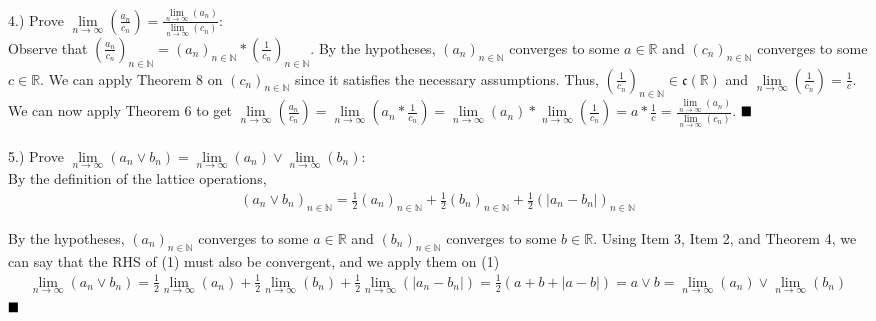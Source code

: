 \documentclass{book}
\begin{document}
4.) Prove $\lim \limits_{n \to \infty}{}\left(\frac{a_n}{c_n}\right) = \frac{\lim \limits_{n \to \infty}{}(a_n)}{\lim \limits_{n \to \infty}{}(c_n)}$: \\
Observe that $\left(\frac{a_n}{c_n}\right)_{n \in \mathbb{N}} = (a_n)_{n \in \mathbb{N}} * \left(\frac{1}{c_n}\right)_{n \in \mathbb{N}}$. By the hypotheses, $(a_n)_{n \in \mathbb{N}}$ converges to some $a \in \mathbb{R}$ and $(c_n)_{n \in \mathbb{N}}$ converges to some $c \in \mathbb{R}$. We can apply Theorem 8 on $(c_n)_{n \in \mathbb{N}}$ since it satisfies the necessary assumptions. Thus, $\left(\frac{1}{c_n}\right)_{n \in \mathbb{N}} \in \mathfrak{c}(\mathbb{R})$ and $\lim \limits_{n \to \infty}{}\left(\frac{1}{c_n}\right) = \frac{1}{c}$. We can now apply Theorem 6 to get $\lim \limits_{n \to \infty}{}\left(\frac{a_n}{c_n}\right) = \lim \limits_{n \to \infty}{}\left(a_n * \frac{1}{c_n}\right) = \lim \limits_{n \to \infty}{}(a_n) * \lim \limits_{n \to \infty}{}\left(\frac{1}{c_n}\right) = a * \frac{1}{c} = \frac{\lim \limits_{n \to \infty}{}(a_n)}{\lim \limits_{n \to \infty}{}(c_n)}$.
$\hfill \blacksquare$ \\ \\


5.) Prove $\lim \limits_{n \to \infty}{}(a_n \lor b_n) = \lim \limits_{n \to \infty}{}(a_n) \lor \lim \limits_{n \to \infty}{}(b_n)$: \\
By the definition of the lattice operations,
\begin{align}
    (a_n \lor b_n)_{n \in \mathbb{N}} = \frac{1}{2} (a_n)_{n \in \mathbb{N}} + \frac{1}{2} (b_n)_{n \in \mathbb{N}} + \frac{1}{2} (|a_n - b_n|)_{n \in \mathbb{N}}
\end{align}

By the hypotheses, $(a_n)_{n \in \mathbb{N}}$ converges to some $a \in \mathbb{R}$ and $(b_n)_{n \in \mathbb{N}}$ converges to some $b \in \mathbb{R}$. Using Item 3, Item 2, and Theorem 4, we can say that the RHS of (1) must also be convergent, and we apply them on (1)
\begin{align}
    \lim \limits_{n \to \infty}{}(a_n \lor b_n) = \frac{1}{2} \lim \limits_{n \to \infty}{}(a_n) + \frac{1}{2} \lim \limits_{n \to \infty}{}(b_n) + \frac{1}{2} \lim \limits_{n \to \infty}{}(|a_n - b_n|) = \frac{1}{2}(a + b + |a - b|) = a \lor b = \lim \limits_{n \to \infty}{}(a_n) \lor \lim \limits_{n \to \infty}{}(b_n)
\end{align}
$\hfill \blacksquare$ \\ \\
\end{document}
